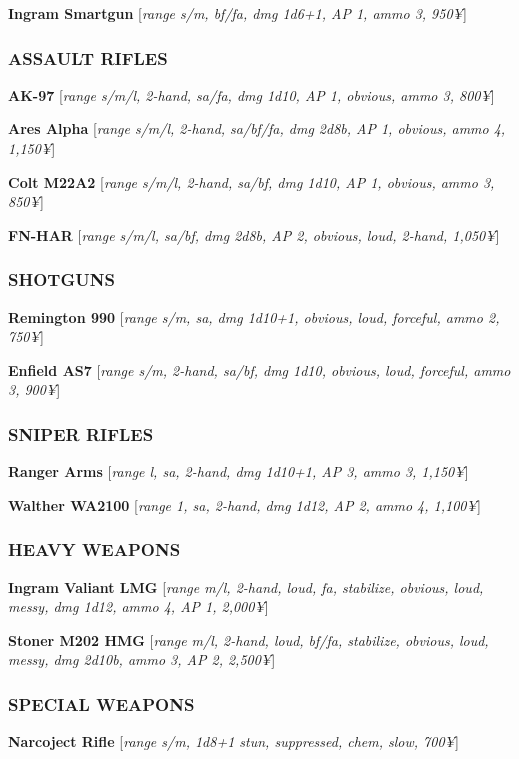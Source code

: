 \documentclass[oneside,10pt]{article}
\begin{document}
\begin{multicols}{2}
\textbf{Ingram Smartgun} [\textit{range s/m, bf/fa, dmg 1d6+1, AP 1,
ammo 3, 950¥}]


\subsubsection{ASSAULT RIFLES}
\textbf{AK-97} [\textit{range s/m/l, 2-hand, sa/fa, dmg 1d10, AP 1, obvious, ammo 3, 800¥}]

\textbf{Ares Alpha} [\textit{range s/m/l, 2-hand, sa/bf/fa, dmg 2d8b, AP 1,
obvious, ammo 4, 1,150¥}]

\textbf{Colt M22A2} [\textit{range s/m/l, 2-hand, sa/bf, dmg 1d10, AP 1,
obvious, ammo 3, 850¥}]

\textbf{FN-HAR} [\textit{range s/m/l, sa/bf, dmg 2d8b, AP 2, obvious, loud,
2-hand, 1,050¥}]


\subsubsection{SHOTGUNS}
\textbf{Remington 990} [\textit{range s/m, sa, dmg 1d10+1, obvious, loud,
forceful, ammo 2, 750¥}]

\textbf{Enfield AS7} [\textit{range s/m, 2-hand, sa/bf, dmg 1d10, obvious,
loud, forceful, ammo 3, 900¥}]


\subsubsection{SNIPER RIFLES}
\textbf{Ranger Arms} [\textit{range l, sa, 2-hand, dmg 1d10+1, AP 3,
ammo 3, 1,150¥}]

\textbf{Walther WA2100} [\textit{range 1, sa, 2-hand, dmg 1d12, AP 2,
ammo 4, 1,100¥}]


\subsubsection{HEAVY WEAPONS}
\textbf{Ingram Valiant LMG} [\textit{range m/l, 2-hand, loud, fa, stabilize,
obvious, loud, messy, dmg 1d12, ammo 4, AP 1,
2,000¥}]

\textbf{Stoner M202 HMG} [\textit{range m/l, 2-hand, loud, bf/fa, stabilize,
obvious, loud, messy, dmg 2d10b, ammo 3, AP 2,
2,500¥}]

\subsubsection{SPECIAL WEAPONS}
\textbf{Narcoject Rifle} [\textit{range s/m, 1d8+1 stun, suppressed, chem,
slow, 700¥}]


\end{multicols}
\end{document}

